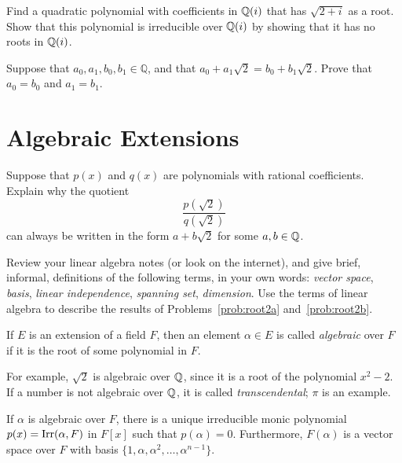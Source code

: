 \begin{problem}
    Find a quadratic polynomial with coefficients in $\mathbb{Q}(i)$ that has $\sqrt{2+i}$ as a root. Show that this polynomial is irreducible over $\mathbb{Q}(i)$ by showing that it has no roots in $\mathbb{Q}(i)$.
\end{problem}




\begin{problem}\label{prob:root2a}
Suppose that $a_0, a_1, b_0, b_1 \in \mathbb{Q}$, and that $a_0 + a_1\sqrt{2} = b_0+b_1\sqrt{2}$.  Prove that $a_0 = b_0$ and $a_1 = b_1$.
\end{problem}

\section{Algebraic Extensions}

\begin{problem}\label{prob:root2b}
Suppose that $p(x)$ and $q(x)$ are polynomials with rational coefficients. Explain why the quotient
$$\frac{p\left(\sqrt{2}\right)}{q\left(\sqrt{2}\right)}$$ can always be written in the form $a + b\sqrt{2}$ for some $a,b \in \mathbb{Q}$.
\end{problem}

\begin{problem}
    Review your linear algebra notes (or look on the internet), and give brief, informal, definitions of the following terms, in your own words: \textit{vector space}, \textit{basis}, \textit{linear independence}, \textit{spanning set}, \textit{dimension}. Use the terms of linear algebra to describe the results of Problems~\ref{prob:root2a} and~\ref{prob:root2b}.
\end{problem}

\begin{definition}\label{def:algebraic}
If $E$ is an extension of a field $F$, then an element $\alpha \in E$ is called \emph{algebraic} over $F$ if it is the root of some polynomial in $F$.
\end{definition}

For example, $\sqrt{2}$ is algebraic over $\mathbb{Q}$, since it is a root of the polynomial $x^2-2$. If a number is not algebraic over $\mathbb{Q}$, it is called \textit{transcendental}; $\pi$ is an example.

\begin{theorem}
    If $\alpha$ is algebraic over $F$, there is a unique irreducible monic polynomial $p(x) = \operatorname{Irr}(\alpha, F)$ in $F[x]$ such that $p(\alpha)=0$.  Furthermore, $F(\alpha)$ is a vector space over $F$ with basis $\{1, \alpha, \alpha^2, \ldots, \alpha^{n-1}\}$.
    \label{thm:aet}
\end{theorem}

